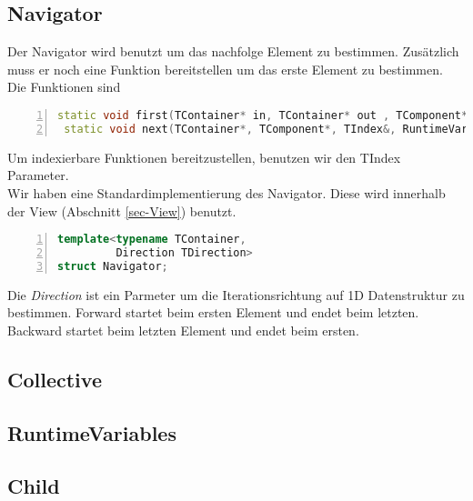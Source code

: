 \subsection{Navigator}
Der Navigator wird benutzt um das nachfolge Element zu bestimmen. Zusätzlich muss er noch eine Funktion bereitstellen um das erste Element zu bestimmen. Die Funktionen sind
\begin{lstlisting}[language=c++, numbers=left]
 static void first(TContainer* in, TContainer* out , TComponent* out, TIndex& out, RuntimeVarialbes& out);
 static void next(TContainer*, TComponent*, TIndex&, RuntimeVarialbes); 
\end{lstlisting}
Um indexierbare Funktionen bereitzustellen, benutzen wir den TIndex Parameter.\\
Wir haben eine Standardimplementierung des Navigator. Diese wird innerhalb der View (Abschnitt \ref{sec-View}) benutzt. 


\begin{lstlisting}[language=c++, numbers=left]
template<typename TContainer,
         Direction TDirection>
struct Navigator;
\end{lstlisting}
Die \textit{Direction} ist ein Parmeter um die Iterationsrichtung auf 1D Datenstruktur zu bestimmen. Forward startet beim ersten Element und endet beim letzten. Backward startet beim letzten Element und endet beim ersten.

\subsection{Collective}


\subsection{RuntimeVariables}


\subsection{Child}